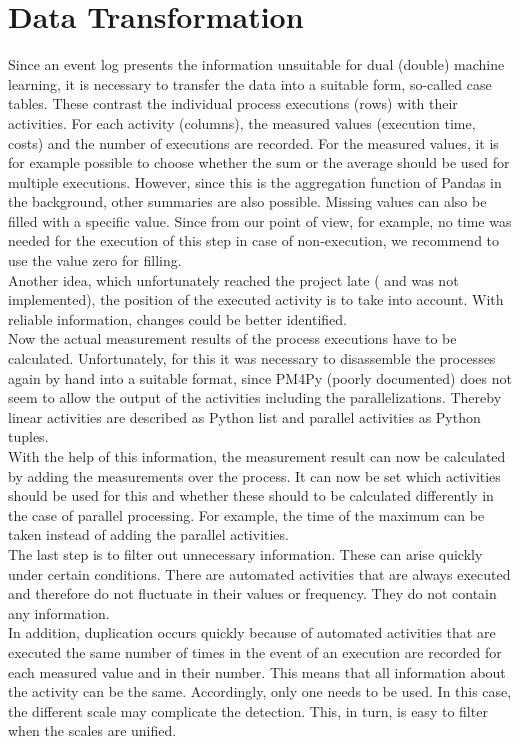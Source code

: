     \section{Data Transformation}
    Since an event log presents the information unsuitable for dual (double) machine learning, it is necessary to transfer the data into a suitable form, so-called case tables. These contrast the individual process executions (rows) with their activities. For each activity (columns), the measured values (execution time, costs) and the number of executions are recorded. For the measured values, it is for example possible to choose whether the sum or the average should be used for multiple executions. However, since this is the aggregation function of Pandas in the background, other summaries are also possible. Missing values can also be filled with a specific value. Since from our point of view, for example, no time was needed for the execution of this step in case of non-execution, we recommend to use the value zero for filling.\\
    Another idea, which unfortunately reached the project late ( and was not implemented), the position of the executed activity is to take into account. With reliable information, changes could be better identified.\\
    Now the actual measurement results of the process executions have to be calculated. Unfortunately, for this it was necessary to disassemble the processes again by hand into a suitable format, since PM4Py (poorly documented) does not seem to allow the output of the activities including the parallelizations. Thereby linear activities are described as Python list and parallel activities as Python tuples.\\
    With the help of this information, the measurement result can now be calculated by adding the measurements over the process. It can now be set which activities should be used for this and whether these should to be calculated differently in the case of parallel processing. For example, the time of the maximum can be taken instead of adding the parallel activities.\\
    The last step is to filter out unnecessary information. These can arise quickly under certain conditions. There are automated activities that are always executed and therefore do not fluctuate in their values or frequency. They do not contain any information.\\
    In addition, duplication occurs quickly because of automated activities that are executed the same number of times in the event of an execution are recorded for each measured value and in their number. This means that all information about the activity can be the same. Accordingly, only one needs to be used. In this case, the different scale may complicate the detection. This, in turn, is easy to filter when the scales are unified.\\
